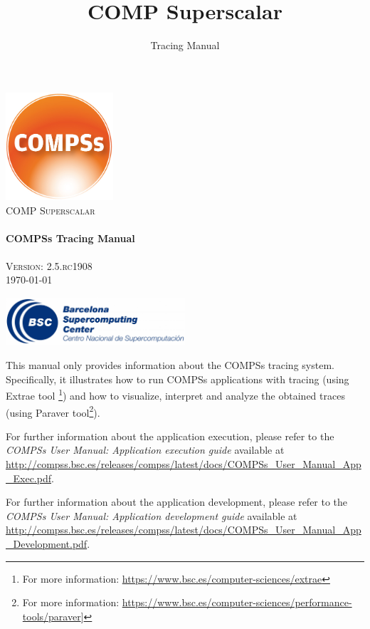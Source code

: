 \documentclass[a4paper,12pt]{article}
\title{COMP Superscalar}
\author{Tracing Manual}
\def \compssversion {2.5.rc1908}
\begin{document}
  \hypersetup{pageanchor=false}
  \begin{titlepage} 
    \begin{center} 
      \includegraphics[width=0.3\textwidth]{./Figures/Logos/degradado-naranja-compss.jpg}~\\[1cm] 
      \textsc{\LARGE COMP Superscalar}\\[1.5cm] 
      
      \HRule \\[0.4cm] 
      { \huge \bfseries COMPSs Tracing Manual \\[0.4cm] }
      \HRule \\[1.5cm] 

      { \large \textsc{Version: \compssversion}} \\[0.3cm]
      { \large \today } 
      
      \vfill 
      \includegraphics[width=0.5\textwidth]{./Figures/bsc_280.jpg}~\\[1cm]
    \end{center} 
  \end{titlepage}
  \hypersetup{pageanchor=true}
  
  {
  
    This manual only provides information about the COMPSs tracing system. Specifically, it illustrates how to run COMPSs applications
    with tracing (using Extrae tool \footnote{For more information: \url{https://www.bsc.es/computer-sciences/extrae}}) and how to visualize, 
    interpret and analyze the obtained traces (using Paraver tool\footnote{For more information: \url{https://www.bsc.es/computer-sciences/performance-tools/paraver}]}).
    \newline

    For further information about the application execution, please refer to the \textit{COMPSs User Manual: Application execution
    guide} available at \url{http://compss.bsc.es/releases/compss/latest/docs/COMPSs_User_Manual_App_Exec.pdf}.
    \newline
    
    For further information about the application development, please refer to the \textit{COMPSs User Manual: Application development
    guide} available at \url{http://compss.bsc.es/releases/compss/latest/docs/COMPSs_User_Manual_App_Development.pdf}.

  }
  
\end{document}
